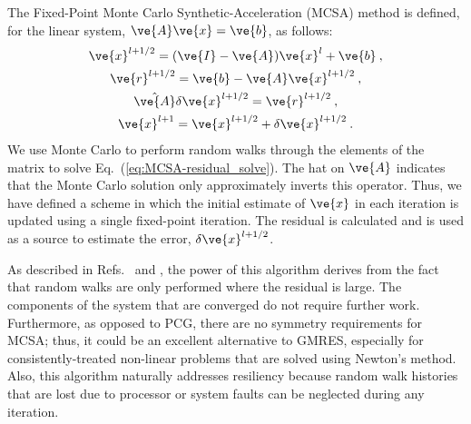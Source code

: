 \documentclass[10pt,letterpaper,english]{article}
\newcommand{\vA}{\ensuremath{\ve{A}}}
\newcommand{\vb}{\ensuremath{\ve{b}}}
\newcommand{\vx}{\ensuremath{\ve{x}}}
\newcommand{\vr}{\ensuremath{\ve{r}}}
\newcommand{\vI}{\ensuremath{\ve{I}}}
\begin{document}
The Fixed-Point Monte Carlo Synthetic-Acceleration (MCSA) method is defined,
for the linear system, $\vA\vx = \vb$, as follows:
\begin{subequations}
  \begin{gather}
    \vx^{l+1/2} = (\vI - \vA)\vx^l + \vb\:, \\
    \vr^{l+1/2} = \vb - \vA\vx^{l+1/2}\:,\\
    \hat{\vA}\delta\vx^{l+1/2} = \vr^{l+1/2}\:,
    \label{eq:MCSA-residual_solve}\\ 
    \vx^{l+1}=\vx^{l+1/2}+\delta\vx^{l+1/2}\:.
  \end{gather}
  \label{eq:general-MCSA}
\end{subequations}
We use Monte Carlo to perform random walks through the elements of the matrix
to solve Eq.~(\ref{eq:MCSA-residual_solve}). The hat on $\vA$ indicates that
the Monte Carlo solution only approximately inverts this operator.  Thus, we
have defined a scheme in which the initial estimate of $\vx$ in each iteration
is updated using a single fixed-point iteration.  The residual is calculated
and is used as a source to estimate the error, $\delta\vx^{l+1/2}$.

As described in Refs.~\cite{rmc} and \cite{mc}, the power of this algorithm
derives from the fact that random walks are only performed where the residual
is large.  The components of the system that are converged do not require
further work.  Furthermore, as opposed to PCG, there are no symmetry
requirements for MCSA; thus, it could be an excellent alternative to GMRES,
especially for consistently-treated non-linear problems that are solved using
Newton's method.  Also, this algorithm naturally addresses resiliency because
random walk histories that are lost due to processor or system faults can be
neglected during any iteration.
\end{document}
